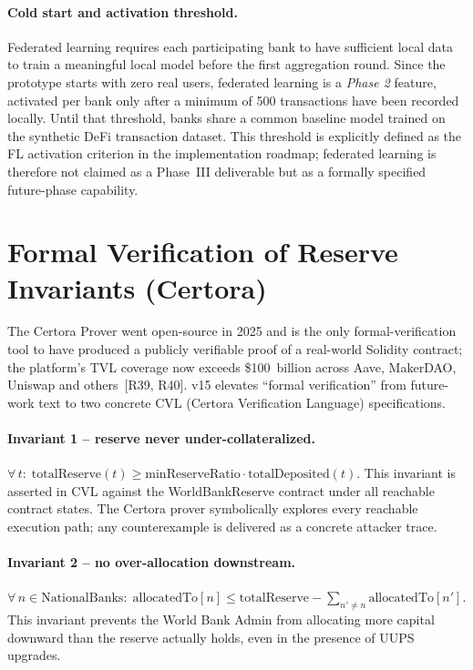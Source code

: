 \documentclass[12pt,a4paper]{report}
\begin{document}
\paragraph{Cold start and activation threshold.}
Federated learning requires each participating bank to have sufficient local data to train a meaningful local model before the first aggregation round. Since the prototype starts with zero real users, federated learning is a \textit{Phase 2} feature, activated per bank only after a minimum of 500 transactions have been recorded locally. Until that threshold, banks share a common baseline model trained on the synthetic DeFi transaction dataset. This threshold is explicitly defined as the FL activation criterion in the implementation roadmap; federated learning is therefore not claimed as a Phase~III deliverable but as a formally specified future-phase capability.

\section{Formal Verification of Reserve Invariants (Certora)}
\label{sec:certora}

The Certora Prover went open-source in 2025 and is the only formal-verification tool to have produced a publicly verifiable proof of a real-world Solidity contract; the platform's TVL coverage now exceeds \$100~billion across Aave, MakerDAO, Uniswap and others~[R39, R40]. v15 elevates ``formal verification'' from future-work text to two concrete CVL (Certora Verification Language) specifications.

\paragraph{Invariant 1 -- reserve never under-collateralized.}
\(\forall\, t:\; \mathrm{totalReserve}(t) \ge \mathrm{minReserveRatio} \cdot \mathrm{totalDeposited}(t).\)
This invariant is asserted in CVL against the WorldBankReserve contract under all reachable contract states. The Certora prover symbolically explores every reachable execution path; any counterexample is delivered as a concrete attacker trace.

\paragraph{Invariant 2 -- no over-allocation downstream.}
\(\forall\, n \in \mathrm{NationalBanks}:\; \mathrm{allocatedTo}[n] \le \mathrm{totalReserve} - \sum_{n' \ne n} \mathrm{allocatedTo}[n'].\)
This invariant prevents the World Bank Admin from allocating more capital downward than the reserve actually holds, even in the presence of UUPS upgrades.
\end{document}
